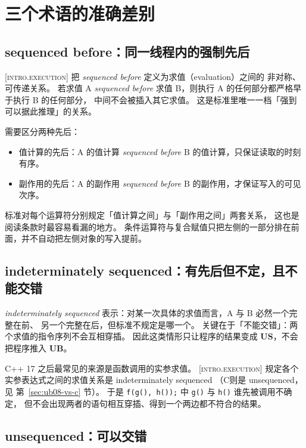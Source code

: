 \documentclass[12pt,a4paper,fontset=fandol]{ctexbook}
\newcommand{\Fn}[1]{\texttt{#1()}}
\newcommand{\Tp}[1]{\texttt{#1}}
\newcommand{\Lang}[1]{\textsf{#1}}
\newcommand{\CL}{\Lang{C}}
\newcommand{\CPP}{\Lang{C++}}
\newcommand{\UB}{\textbf{\textsf{UB}}}
\newcommand{\USB}{\textbf{\textsf{US}}}
\newcommand{\Std}[1]{\textsc{[#1]}}
\begin{document}
\section{三个术语的准确差别}\label{sec:ub08-terms}

\subsection{sequenced before：同一线程内的强制先后}\label{sec:ub08-seq-before}

\Std{intro.execution} 把 \emph{sequenced before} 定义为求值（evaluation）之间的
非对称、可传递关系。
若求值 A \emph{sequenced before} 求值 B，则执行 A 的任何部分都严格早于执行 B 的任何部分，
中间不会被插入其它求值。
这是标准里唯一一档「强到可以据此推理」的关系。

需要区分两种先后：

\begin{itemize}
\item 值计算的先后：A 的值计算 \emph{sequenced before} B 的值计算，只保证读取的时刻有序。
\item 副作用的先后：A 的副作用 \emph{sequenced before} B 的副作用，才保证写入的可见次序。
\end{itemize}

标准对每个运算符分别规定「值计算之间」与「副作用之间」两套关系，
这也是阅读条款时最容易看漏的地方。
条件运算符与复合赋值只把左侧的一部分排在前面，并不自动把左侧对象的写入提前。

\subsection{indeterminately sequenced：有先后但不定，且不能交错}\label{sec:ub08-indet}

\emph{indeterminately sequenced} 表示：对某一次具体的求值而言，A 与 B 必然一个完整在前、
另一个完整在后，但标准不规定是哪一个。
关键在于「不能交错」：两个求值的指令序列不会互相穿插。
因此这类情形只让程序的结果变成 \USB{}，不会把程序推入 \UB{}。

\CPP{} 17 之后最常见的来源是函数调用的实参求值。
\Std{intro.execution} 规定各个实参表达式之间的求值关系是 indeterminately sequenced
（\CL 则是 unsequenced，见 第~\ref{sec:ub08-vs-c} 节）。
于是 \Tp{f(g(), h());} 中 \Fn{g} 与 \Fn{h} 谁先被调用不确定，
但不会出现两者的语句相互穿插、得到一个两边都不符合的结果。

\subsection{unsequenced：可以交错}\label{sec:ub08-unsequenced}
\end{document}
